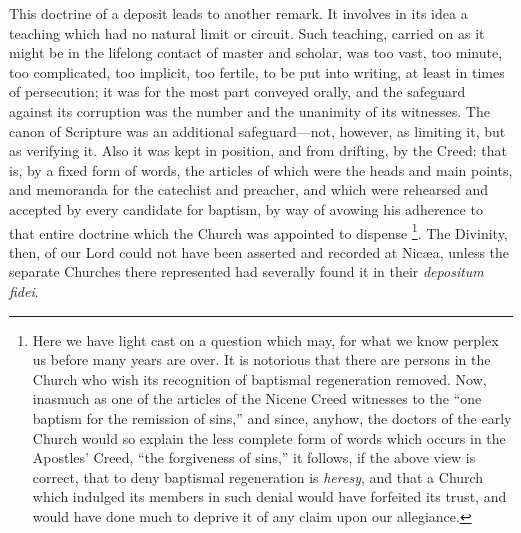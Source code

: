 This doctrine of a deposit leads to another
remark. It involves in its idea a teaching which had no natural limit
or circuit. Such teaching, carried on as it might be in the lifelong
contact of master and scholar, was too vast, too minute, too
complicated, too implicit, too fertile, to be put into writing, at
least in times of persecution; it was for the most part conveyed
orally, and the safeguard against its corruption was the number and
the unanimity of its witnesses. The canon of Scripture was an
additional safeguard—not, however, as limiting it, but as verifying
it. Also it was kept in position, and from drifting, by the Creed:
that is, by a fixed form of words, the articles of which were the
heads and main points, and memoranda for the catechist and preacher,
and which were rehearsed and accepted by every candidate for baptism,
by way of avowing his adherence to that entire doctrine which the Church was appointed to dispense \footnote{Here we have light cast on a question which
may, for what we know perplex us before many years are over. It is
notorious that there are persons in the Church who wish its
recognition of baptismal regeneration removed. Now, inasmuch as one of
the articles of the Nicene Creed witnesses to the ``one baptism for the
remission of sins,'' and since, anyhow, the doctors of the early Church
would so explain the less complete form of words which occurs in the
Apostles' Creed, ``the forgiveness of sins,'' it follows, if the above
view is correct, that to deny baptismal regeneration is \emph{heresy},
and that a Church which indulged its members in such denial would have
forfeited its trust, and would have done much to deprive it of any
claim upon our allegiance.}. The Divinity, then, of our Lord could not have been asserted
and recorded at Nicæa, unless the separate Churches there represented
had severally found it in their \emph{depositum fidei}.

